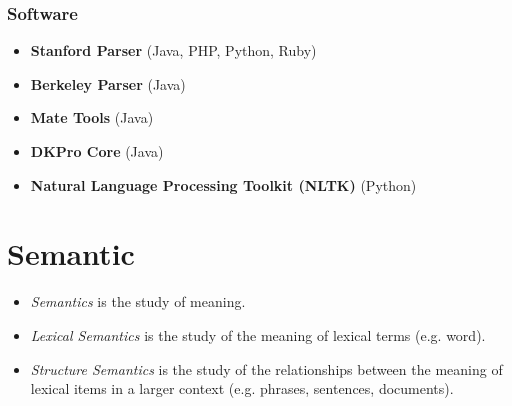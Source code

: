             \subsubsection{Software} %
                \begin{itemize}
                	\item \textbf{Stanford Parser} (Java, PHP, Python, Ruby)
                	\item \textbf{Berkeley Parser} (Java)
                	\item \textbf{Mate Tools} (Java)
                	\item \textbf{DKPro Core} (Java)
                	\item \textbf{Natural Language Processing Toolkit (NLTK)} (Python)
                \end{itemize}

    \section{Semantic} %
        \begin{itemize}
        	\item \textit{Semantics} is the study of meaning.
        	\item \textit{Lexical Semantics} is the study of the meaning of lexical terms (e.g. word).
        	\item \textit{Structure Semantics} is the study of the relationships between the meaning of lexical items in a larger context (e.g. phrases, sentences, documents).
        \end{itemize}

